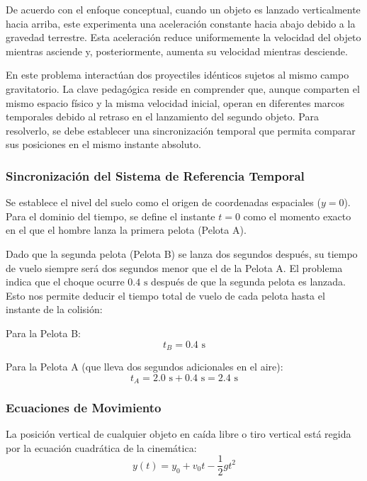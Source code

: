 \documentclass[12pt, a4paper]{article}
\begin{document}
De acuerdo con el enfoque conceptual, cuando un objeto es lanzado verticalmente hacia arriba, este experimenta una aceleración constante hacia abajo debido a la gravedad terrestre. Esta aceleración reduce uniformemente la velocidad del objeto mientras asciende y, posteriormente, aumenta su velocidad mientras desciende. 

En este problema interactúan dos proyectiles idénticos sujetos al mismo campo gravitatorio. La clave pedagógica reside en comprender que, aunque comparten el mismo espacio físico y la misma velocidad inicial, operan en diferentes marcos temporales debido al retraso en el lanzamiento del segundo objeto. Para resolverlo, se debe establecer una sincronización temporal que permita comparar sus posiciones en el mismo instante absoluto.

\subsubsection*{Sincronización del Sistema de Referencia Temporal}

Se establece el nivel del suelo como el origen de coordenadas espaciales ($y = 0$). Para el dominio del tiempo, se define el instante $t = 0$ como el momento exacto en el que el hombre lanza la primera pelota (Pelota A). 

Dado que la segunda pelota (Pelota B) se lanza dos segundos después, su tiempo de vuelo siempre será dos segundos menor que el de la Pelota A. El problema indica que el choque ocurre $0.4 \text{ s}$ después de que la segunda pelota es lanzada. Esto nos permite deducir el tiempo total de vuelo de cada pelota hasta el instante de la colisión:

Para la Pelota B:
\begin{equation}
t_B = 0.4 \text{ s}
\end{equation}

Para la Pelota A (que lleva dos segundos adicionales en el aire):
\begin{equation}
t_A = 2.0 \text{ s} + 0.4 \text{ s} = 2.4 \text{ s}
\end{equation}

\subsubsection*{Ecuaciones de Movimiento}

La posición vertical de cualquier objeto en caída libre o tiro vertical está regida por la ecuación cuadrática de la cinemática:
\begin{equation}
y(t) = y_0 + v_0 t - \frac{1}{2} g t^2
\end{equation}
\end{document}
